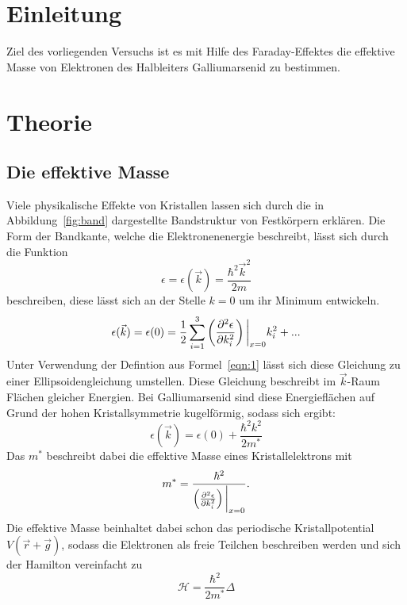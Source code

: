 \section{Einleitung}
Ziel des vorliegenden Versuchs ist es mit Hilfe des Faraday-Effektes die effektive
Masse von Elektronen des Halbleiters Galliumarsenid zu bestimmen.
\section{Theorie}
\subsection{Die effektive Masse}
Viele physikalische Effekte von Kristallen lassen sich durch die in Abbildung~\ref{fig:band}
dargestellte Bandstruktur von Festkörpern erklären.
Die Form der Bandkante, welche die Elektronenenergie beschreibt, lässt sich durch die Funktion
\begin{equation}
  \epsilon = \epsilon(\vec{k}) = \frac{\hbar^2\vec{k}^2}{2m}
  \label{eqn:1}
\end{equation}
beschreiben, diese lässt sich an der Stelle $k=0$ um ihr Minimum entwickeln.
\begin{equation}
  \epsilon(\vec{k}) = \epsilon(0) = \frac{1}{2}\sum_{i=1}^3 \left(\frac{\partial^2 \epsilon}{\partial k_i^2}\right)\bigg{\vert}_{x=0} k_i^2 + ...
\end{equation}
Unter Verwendung der Defintion aus Formel~\ref{eqn:1} lässt sich diese Gleichung zu einer Ellipsoidengleichung umstellen. Diese Gleichung beschreibt
im $\vec{k}$-Raum Flächen gleicher Energien. Bei Galliumarsenid sind diese Energieflächen auf Grund der hohen Kristallsymmetrie kugelförmig, sodass
sich ergibt:
\begin{equation}
  \epsilon(\vec{k}) = \epsilon(0) + \frac{\hbar^2k^2}{2m^{*}}
\end{equation}
Das $m^*$ beschreibt dabei die effektive Masse eines Kristallelektrons mit
\begin{equation}
m^* = \frac{\hbar^2}{\left(\frac{\partial^2 \epsilon}{\partial k_i^2}\right)\bigg{\vert}_{x=0}}.
\end{equation}
Die effektive Masse beinhaltet dabei schon das periodische Kristallpotential $V(\vec{r}+\vec{g})$, sodass die Elektronen als
freie Teilchen beschreiben werden und sich der Hamilton vereinfacht zu
\begin{equation*}
  \mathscr{H} = \frac{\hbar^2}{2m^*}\Delta
\end{equation*}

